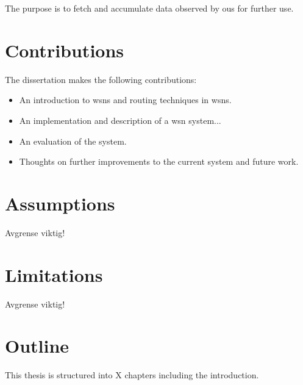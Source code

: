 \documentclass[USenglish]{uit-thesis}
\begin{document}
The purpose is to fetch and accumulate data observed by \gls{ou}s  for further use.


\section{Contributions}
The dissertation makes the following contributions:
\begin{itemize}
\item An introduction to \gls{wsn}s and routing techniques in \gls{wsn}s.
\item An implementation and description of a \gls{wsn} system...
\item An evaluation of the system.
\item Thoughts on further improvements to the current system and future work.
\end{itemize}

\section{Assumptions}
Avgrense viktig!

\section{Limitations}
Avgrense viktig!

\section{Outline}
This thesis is structured into X chapters including the introduction.
\end{document}
